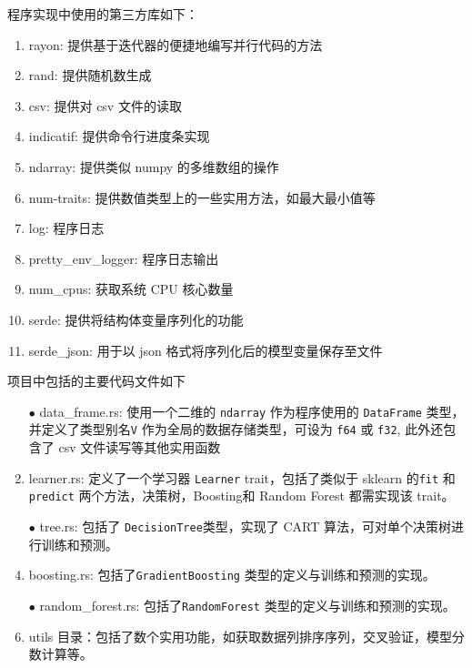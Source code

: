 \documentclass[12pt]{article}
\begin{document}
程序实现中使用的第三方库如下：
\begin{enumerate}
    \item rayon: 提供基于迭代器的便捷地编写并行代码的方法
    \item rand: 提供随机数生成
    \item csv: 提供对 csv 文件的读取
    \item indicatif: 提供命令行进度条实现
    \item ndarray: 提供类似 numpy 的多维数组的操作
    \item num-traits: 提供数值类型上的一些实用方法，如最大最小值等
    \item log: 程序日志
    \item pretty\_env\_logger: 程序日志输出
    \item num\_cpus: 获取系统 CPU 核心数量
    \item serde: 提供将结构体变量序列化的功能
    \item serde\_json: 用于以 json 格式将序列化后的模型变量保存至文件
\end{enumerate}

项目中包括的主要代码文件如下
\begin{enumerate}
    \item[$\bullet$] data\_frame.rs: 使用一个二维的 \lstinline{ndarray} 作为程序使用的 \lstinline{DataFrame} 类型，并定义了类型别名\lstinline{V} 作为全局的数据存储类型，可设为 \lstinline{f64} 或 \lstinline{f32}, 此外还包含了 csv 文件读写等其他实用函数
    \item[$\bullet$] learner.rs: 定义了一个学习器 \lstinline{Learner} trait，包括了类似于 sklearn 的\lstinline{fit} 和\lstinline{predict} 两个方法，决策树，Boosting和 Random Forest 都需实现该 trait。
    \item[$\bullet$] tree.rs: 包括了 \lstinline{DecisionTree}类型，实现了 CART 算法，可对单个决策树进行训练和预测。
    \item[$\bullet$] boosting.rs: 包括了\lstinline{GradientBoosting} 类型的定义与训练和预测的实现。
    \item[$\bullet$] random\_forest.rs: 包括了\lstinline{RandomForest} 类型的定义与训练和预测的实现。
    \item[$\bullet$] utils 目录：包括了数个实用功能，如获取数据列排序序列，交叉验证，模型分数计算等。
\end{enumerate}
\end{document}
